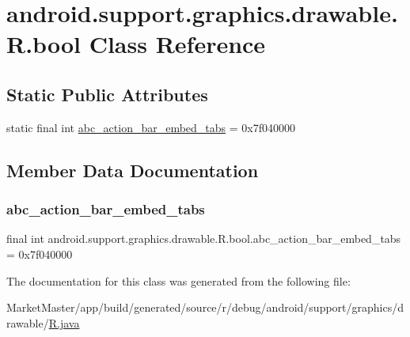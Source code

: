 \hypertarget{classandroid_1_1support_1_1graphics_1_1drawable_1_1R_1_1bool}{}\section{android.\+support.\+graphics.\+drawable.\+R.\+bool Class Reference}
\label{classandroid_1_1support_1_1graphics_1_1drawable_1_1R_1_1bool}
\subsection*{Static Public Attributes}
\begin{DoxyCompactItemize}
\item 
static final int \mbox{\hyperlink{classandroid_1_1support_1_1graphics_1_1drawable_1_1R_1_1bool_a7458f074ec76e2f07e8e86a776e918a4}{abc\+\_\+action\+\_\+bar\+\_\+embed\+\_\+tabs}} = 0x7f040000
\end{DoxyCompactItemize}


\subsection{Member Data Documentation}
\mbox{\label{classandroid_1_1support_1_1graphics_1_1drawable_1_1R_1_1bool_a7458f074ec76e2f07e8e86a776e918a4}} 
\subsubsection{\texorpdfstring{abc\+\_\+action\+\_\+bar\+\_\+embed\+\_\+tabs}{abc\_action\_bar\_embed\_tabs}}
{\footnotesize\ttfamily final int android.\+support.\+graphics.\+drawable.\+R.\+bool.\+abc\+\_\+action\+\_\+bar\+\_\+embed\+\_\+tabs = 0x7f040000\hspace{0.3cm}{\ttfamily [static]}}



The documentation for this class was generated from the following file\+:\begin{DoxyCompactItemize}
\item 
Market\+Master/app/build/generated/source/r/debug/android/support/graphics/drawable/\mbox{\hyperlink{debug_2android_2support_2graphics_2drawable_2R_8java}{R.\+java}}\end{DoxyCompactItemize}
